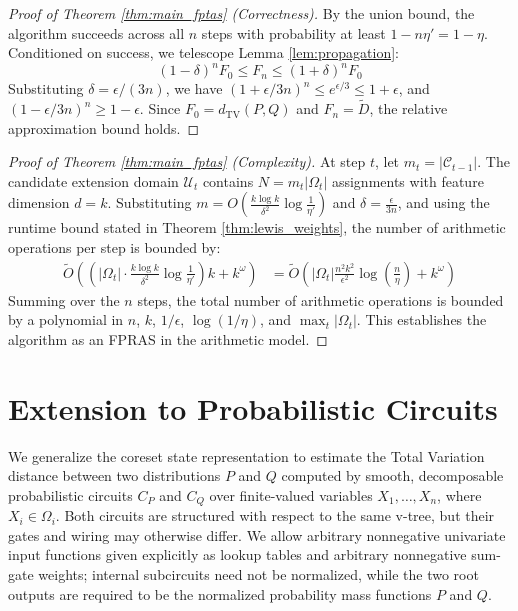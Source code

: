 \documentclass{article}
\begin{document}
\begin{proof}[Proof of Theorem \ref{thm:main_fptas} (Correctness)]
By the union bound, the algorithm succeeds across all $n$ steps with probability at least $1 - n \eta' = 1 - \eta$. Conditioned on success, we telescope Lemma \ref{lem:propagation}:
\begin{equation}
    (1 - \delta)^n F_0 \le F_n \le (1 + \delta)^n F_0
\end{equation}
Substituting $\delta = \epsilon / (3n)$, we have $(1 + \epsilon/3n)^n \le e^{\epsilon/3} \le 1 + \epsilon$, and $(1 - \epsilon/3n)^n \ge 1 - \epsilon$. Since $F_0 = d_{\mathrm{TV}}(P, Q)$ and $F_n = \tilde{D}$, the relative approximation bound holds.
\end{proof}

\begin{proof}[Proof of Theorem \ref{thm:main_fptas} (Complexity)]
At step $t$, let $m_t = |\mathcal{C}_{t-1}|$. The candidate extension domain $\mathcal{U}_t$ contains $N = m_t |\Omega_t|$ assignments with feature dimension $d = k$. Substituting $m = O\left( \frac{k \log k}{\delta^2} \log\frac{1}{\eta'} \right)$ and $\delta = \frac{\epsilon}{3n}$, and using the runtime bound stated in Theorem \ref{thm:lewis_weights}, the number of arithmetic operations per step is bounded by:
\begin{align}
    \widetilde{O} \left( \left(|\Omega_t| \cdot \frac{k \log k}{\delta^2} \log\frac{1}{\eta'}\right) k + k^\omega \right) 
    &= \widetilde{O} \left( |\Omega_t| \frac{n^2 k^2}{\epsilon^2} \log\left(\frac{n}{\eta}\right) + k^\omega \right)
\end{align}
Summing over the $n$ steps, the total number of arithmetic operations is bounded by a polynomial in $n$, $k$, $1/\epsilon$, $\log(1/\eta)$, and $\max_t |\Omega_t|$. This establishes the algorithm as an FPRAS in the arithmetic model.
\end{proof}

\section{Extension to Probabilistic Circuits}
\label{sec:pc}

We generalize the coreset state representation to estimate the Total Variation distance between two distributions $P$ and $Q$ computed by smooth, decomposable probabilistic circuits $C_P$ and $C_Q$ over finite-valued variables $X_1, \dots, X_n$, where $X_i\in\Omega_i$. Both circuits are structured with respect to the same v-tree, but their gates and wiring may otherwise differ. We allow arbitrary nonnegative univariate input functions given explicitly as lookup tables and arbitrary nonnegative sum-gate weights; internal subcircuits need not be normalized, while the two root outputs are required to be the normalized probability mass functions $P$ and $Q$.
\end{document}
